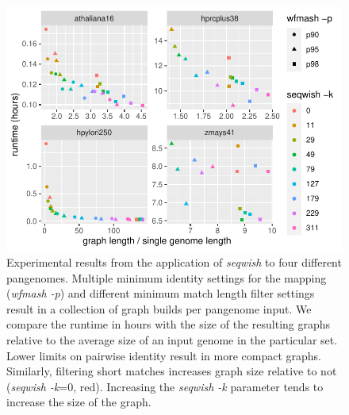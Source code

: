 \begin{figure}[b]
   \includegraphics[width=\linewidth]{fig_experiment_stats.pdf}
   \caption{
     Experimental results from the application of \textit{seqwish} to four different pangenomes.
     Multiple minimum identity settings for the mapping (\textit{wfmash -p}) and different minimum match length filter settings result in a collection of graph builds per pangenome input.
     We compare the runtime in hours with the size of the resulting graphs relative to the average size of an input genome in the particular set.
     Lower limits on pairwise identity result in more compact graphs.
     Similarly, filtering short matches increases graph size relative to not (\textit{seqwish -k}=0, red).
     Increasing the \textit{seqwish -k} parameter tends to increase the size of the graph.
    }
    \label{fig:experiments}
\end{figure}

